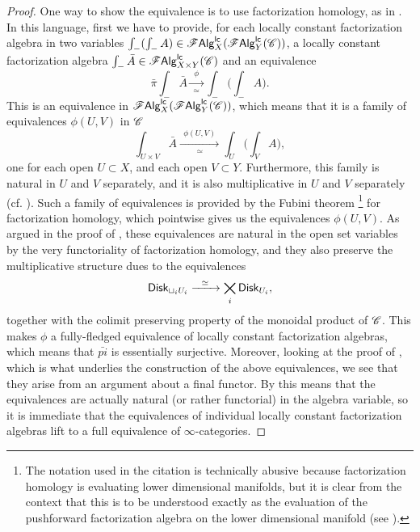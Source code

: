 \documentclass[../text]{subfiles}
\begin{document}
\begin{proof}
    One way to show the equivalence is to use factorization homology, as in . In this language, first we have to provide, for each locally constant factorization algebra in two variables $\int_{-}(\int_{-} A) \in \mathscr{F} \mathsf{Alg}^{\mathsf{lc}}_{X}(\mathscr{F} \mathsf{Alg}^{\mathsf{lc}}_{Y}(\mathscr{C}))$, a locally constant factorization algebra $\int_{-} \bar{A} \in \mathscr{F} \mathsf{Alg}^{\mathsf{lc}}_{X \times Y} (\mathscr{C})$ and an equivalence
    \begin{equation}
        \bar{\pi} \int_{-} \bar{A} \xrightarrow[\simeq]{\ \ \phi \ \ } \int_{-} \big( \int_{-} A \big).
    \end{equation}
    This is an equivalence in $\mathscr{F} \mathsf{Alg}^{\mathsf{lc}}_{X}(\mathscr{F} \mathsf{Alg}^{\mathsf{lc}}_{Y}(\mathscr{C}))$, which means that it is a family of equivalences $\phi(U,V)$ in $\mathscr{C}$
    \begin{equation}
        \int_{U \times V} \bar{A} \xrightarrow[\simeq]{\ \ \phi (U,V)\ \ } \int_{U} \big( \int_{V} A \big),
    \end{equation}
    one for each open $U \subset X$, and each open $V \subset Y$. Furthermore, this family is natural in $U$ and $V$ separately, and it is also multiplicative in $U$ and $V$ separately (cf. ). Such a family of equivalences is provided by the Fubini theorem \cite[cor.2.29]{aft_fhstrat}\footnote{The notation used in the citation is technically abusive because factorization homology is evaluating lower dimensional manifolds, but it is clear from the context that this is to be understood exactly as the evaluation of the pushforward factorization algebra on the lower dimensional manifold (see ).} for factorization homology, which pointwise gives us the equivalences $\phi(U,V)$. As argued in the proof of , these equivalences are natural in the open set variables by the very functoriality of factorization homology, and they also preserve the multiplicative structure dues to the equivalences
    \begin{equation}
        \disk[r]_{\sqcup_{i} U_i} \xrightarrow{\ \ \simeq \ \ } \bigtimes_{i} \disk[r]_{U_i},
    \end{equation}
    together with the colimit preserving property of the monoidal product of $\mathscr{C}$. This makes $\phi$ a fully-fledged equivalence of locally constant factorization algebras, which means that $\bar{pi}$ is essentially surjective. Moreover, looking at the proof of \cite[thm.2.25]{aft_fhstrat}, which is what underlies the construction of the above equivalences, we see that they arise from an argument about a final functor. By  this means that the equivalences are actually natural (or rather functorial) in the algebra variable, so it is immediate that the equivalences of individual locally constant factorization algebras lift to a full equivalence of $\infty$-categories.
\end{proof}
\end{document}
